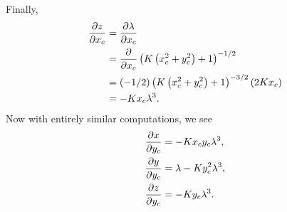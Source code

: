 \documentclass{ximera}
\begin{document}
\begin{problem}
\begin{freeResponse}
   Finally, 
    \begin{align*}
    \pp[z]{x_c} &= \pp[\lambda]{x_c}\\
    &= \pp{x_c}\left(K\left(x_c^2 + y_c^2\right)+1\right)^{-1/2}\\
    &= (-1/2)\left(K\left(x_c^2 + y_c^2\right)+1\right)^{-3/2}(2Kx_c)\\
    &= -Kx_c \lambda^3.
    \end{align*}
    Now with entirely similar computations, we see
    \begin{align*}
      \pp[x]{y_c} &= -Kx_cy_c \lambda^3,\\
      \pp[y]{y_c} &= \lambda - Ky_c^2 \lambda^3,\\
      \pp[z]{y_c} &= -Ky_c \lambda^3.
    \end{align*}
  \end{freeResponse}
\end{problem}
\end{document}
